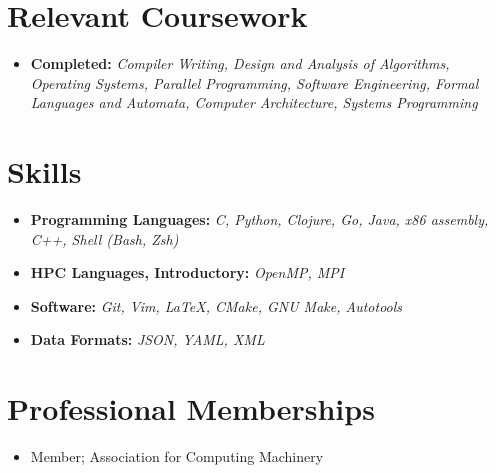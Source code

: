 \documentclass[10pt,letterpaper,sans]{moderncv}
\begin{document}
\section{Relevant Coursework}

\vspace{2pt}

\begin{itemize}
    \item{
        \textbf{Completed:}
        \textit{
            Compiler Writing, Design and Analysis of Algorithms, Operating
            Systems, Parallel Programming, Software Engineering, Formal
            Languages and Automata, Computer Architecture, Systems Programming
        }
    }
\end{itemize}

\section{Skills}

\vspace{3pt}

\begin{itemize}

    \item{
        \textbf{Programming Languages:}
        \textit{
            C, Python, Clojure, Go, Java,  x86 assembly, C++, Shell (Bash, Zsh)
        }
    }
    \vspace{3pt}
    \item{
        \textbf{HPC Languages, Introductory:}
        \textit{
            OpenMP, MPI
        }
    }
    \item{
        \textbf{Software:}
        \textit{
            Git, Vim, \LaTeX, CMake, GNU Make, Autotools
        }
    }
    \item {
        \textbf{Data Formats:}
        \textit{
            JSON, YAML, XML
        }
    }
\end{itemize}

\section{Professional Memberships}
\begin{itemize}
    \item {
            Member; Association for Computing Machinery
    }
\end{itemize}
\end{document}
